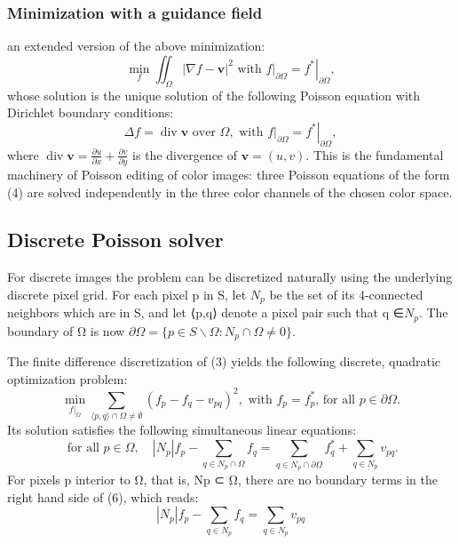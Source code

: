 \documentclass[10pt, a4paper]{article}%
\begin{document}
 \subsubsection{Minimization with a guidance field}
 an extended version of the above minimization:
 \begin{equation}
     \min _f \iint_{\Omega}|\nabla f-\mathbf{v}|^2 \text { with }\left.f\right|_{\partial \Omega}=\left.f^*\right|_{\partial \Omega},
 \end{equation}
 whose solution is the unique solution of the following Poisson equation with Dirichlet boundary conditions:
 \begin{equation}
     \Delta f=\operatorname{div} \mathbf{v} \text { over } \Omega, \text { with }\left.f\right|_{\partial \Omega}=\left.f^*\right|_{\partial \Omega},
 \end{equation}
 where $\operatorname{div} \mathbf{v}=\frac{\partial u}{\partial x}+\frac{\partial v}{\partial y}$ is the divergence of $\mathbf{v}=(u, v)$.
 This is the fundamental machinery of Poisson editing of color images: three Poisson equations of the form (4) are solved independently in the three color channels of the chosen color space.
\subsection{Discrete Poisson solver}
For discrete images the problem can be discretized naturally using the underlying discrete pixel grid. For each pixel p in S, let $N_p$ be the set of its 4-connected neighbors which are in S, and let ⟨p,q⟩ denote a pixel pair such that q ∈$N_p$. The boundary of Ω is now $\partial \Omega=\{p \in S \backslash \Omega:N_p\cap\Omega\neq0\}$.

The finite difference discretization of (3) yields the following discrete, quadratic optimization problem:
\begin{equation}
    \min _{\left.f\right|_{\Omega}} \sum_{\langle p, q\rangle \cap \Omega \neq \emptyset}\left(f_p-f_q-v_{p q}\right)^2, \text { with } f_p=f_p^* \text {, for all } p \in \partial \Omega.
\end{equation}
Its solution satisfies the following simultaneous linear equations:
\begin{equation}
    \text { for all } p \in \Omega, \quad\left|N_p\right| f_p-\sum_{q \in N_p \cap \Omega} f_q=\sum_{q \in N_p \cap \partial \Omega} f_q^*+\sum_{q \in N_p} v_{p q} .
\end{equation}
For pixels p interior to Ω, that is, Np ⊂ Ω, there are no boundary terms in the right hand side of (6), which reads:
\begin{equation}
    \left|N_p\right| f_p-\sum_{q \in N_p} f_q=\sum_{q \in N_p} v_{p q}
\end{equation}
\end{document}
